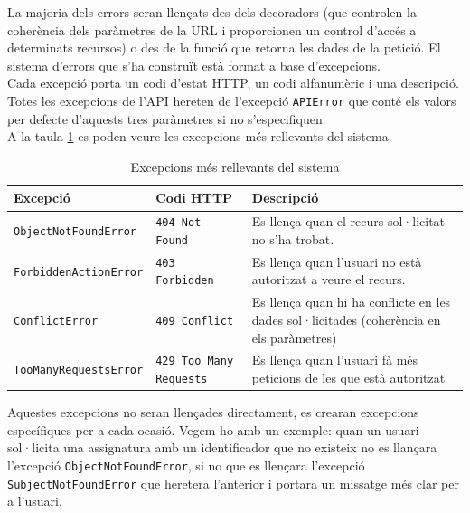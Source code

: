 La majoria dels errors seran llençats des dels decoradors (que controlen la coherència dels paràmetres de la \ac{URL} i proporcionen un control d'accés a determinats recursos) o des de la funció que retorna les dades de la petició. El sistema d'errors que s'ha construït està format a base d'excepcions.\\

Cada excepció porta un codi d'estat \ac{HTTP}, un codi alfanumèric i una descripció. Totes les excepcions de l'\ac{API} hereten de l'excepció \texttt{APIError} que conté els valors per defecte d'aquests tres paràmetres si no s'especifiquen.\\

A la taula \ref{table:excepcions} es poden veure les excepcions més rellevants del sistema.

\begin{table}[h!]
	\begin{center}
 		\begin{tabularx}{\textwidth}{|l|l|X|}
  			\hline
 			\bfseries Excepció & \bfseries Codi \ac{HTTP} & \bfseries Descripció\\ \hline
			\texttt{ObjectNotFoundError} & \texttt{404 Not Found} &  Es llença quan el recurs sol·licitat no s'ha trobat.\\ \hline
			\texttt{ForbiddenActionError} & \texttt{403 Forbidden} & Es llença quan l'usuari no està autoritzat a veure el recurs. \\ \hline
			\texttt{ConflictError} & \texttt{409 Conflict} & Es llença quan hi ha conflicte en les dades sol·licitades (coherència en els paràmetres) \\ \hline
			\texttt{TooManyRequestsError} & \texttt{429 Too Many Requests} & Es llença quan l'usuari fà més peticions de les que està autoritzat \\ \hline
		\end{tabularx}
	\end{center}
	\caption{Excepcions més rellevants del sistema}
	\label{table:excepcions}
\end{table}

Aquestes excepcions no seran llençades directament, es crearan excepcions específiques per a cada ocasió. Vegem-ho amb un exemple: quan un usuari sol·licita una assignatura amb un identificador que no existeix no es llançara l'excepció \texttt{ObjectNotFoundError}, si no que es llençara l'excepció \texttt{SubjectNotFoundError} que heretera l'anterior i portara un missatge més clar per a l'usuari.\\

